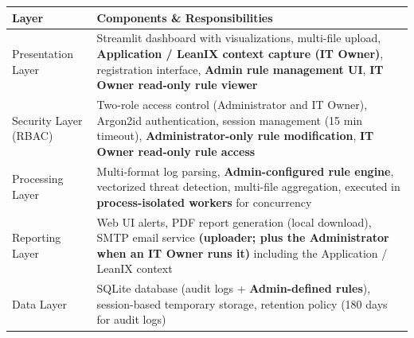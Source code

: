 \documentclass[12pt,a4paper]{article}
\begin{document}
\begin{figure}[H]
\label{fig:architecture}
\end{figure}

\begin{table}[H]
\centering
\begin{tabular}{|p{3.5cm}|p{11cm}|}
\hline
\textbf{Layer} & \textbf{Components \& Responsibilities} \\
\hline
Presentation Layer & Streamlit dashboard with visualizations, multi-file upload, \textbf{Application / LeanIX context capture (IT Owner)}, registration interface, \textbf{Admin rule management UI}, \textbf{IT Owner read-only rule viewer} \\
\hline
Security Layer (RBAC) & Two-role access control (Administrator and IT Owner), Argon2id authentication, session management (15 min timeout), \textbf{Administrator-only rule modification}, \textbf{IT Owner read-only rule access} \\
\hline
Processing Layer & Multi-format log parsing, \textbf{Admin-configured rule engine}, vectorized threat detection, multi-file aggregation, executed in \textbf{process-isolated workers} for concurrency \\
\hline
Reporting Layer & Web UI alerts, PDF report generation (local download), SMTP email service \textbf{(uploader; plus the Administrator when an IT Owner runs it)} including the Application / LeanIX context \\
\hline
Data Layer & SQLite database (audit logs + \textbf{Admin-defined rules}), session-based temporary storage, retention policy (180 days for audit logs) \\
\hline
\end{tabular}
\label{tab:layers}
\end{table}
\end{document}
